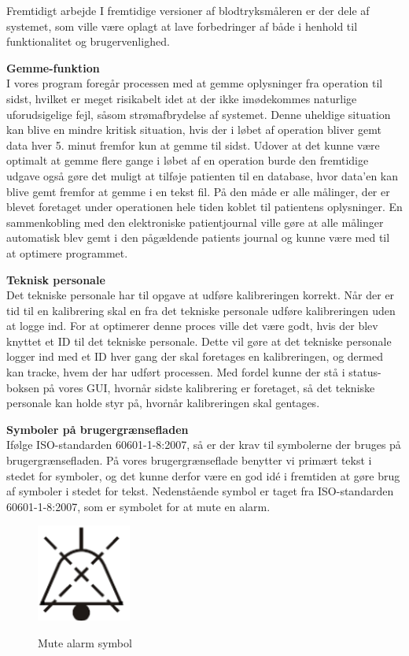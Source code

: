 Fremtidigt arbejde
I fremtidige versioner af blodtryksmåleren er der dele af systemet, som ville være oplagt at lave forbedringer af både i henhold til funktionalitet og brugervenlighed. 

\textbf{Gemme-funktion}
\\I vores program foregår processen med at gemme oplysninger fra operation til sidst, hvilket er meget risikabelt idet at der ikke imødekommes naturlige uforudsigelige fejl, såsom strømafbrydelse af systemet. Denne uheldige situation kan blive en mindre kritisk situation, hvis der i løbet af operation bliver gemt data hver 5. minut fremfor kun at gemme til sidst.
Udover at det kunne være optimalt at gemme flere gange i løbet af en operation burde den fremtidige udgave også gøre det muligt at tilføje patienten til en database, hvor data’en kan blive gemt fremfor at gemme i en tekst fil. På den måde er alle målinger, der er blevet foretaget under operationen hele tiden koblet til patientens oplysninger. En sammenkobling med den elektroniske patientjournal ville gøre at alle målinger automatisk blev gemt i den pågældende patients journal og kunne være med til at optimere programmet.

\textbf{Teknisk personale}
\\Det tekniske personale har til opgave at udføre kalibreringen korrekt. Når der er tid til en kalibrering skal en fra det tekniske personale udføre kalibreringen uden at logge ind. For at optimerer denne proces ville det være godt, hvis der blev knyttet et ID til det tekniske personale. Dette vil gøre at det tekniske personale logger ind med et ID hver gang der skal foretages en kalibreringen, og dermed kan tracke, hvem der har udført processen. Med fordel kunne der stå i status-boksen på vores GUI, hvornår sidste kalibrering er foretaget, så det tekniske personale kan holde styr på, hvornår kalibreringen skal gentages.

\textbf{Symboler på brugergrænsefladen}
\\Ifølge ISO-standarden 60601-1-8:2007, så er der krav til symbolerne der bruges på brugergrænsefladen. På vores brugergrænseflade benytter vi primært tekst i stedet for symboler, og det kunne derfor være en god idé i fremtiden at gøre brug af symboler i stedet for tekst. Nedenstående symbol er taget fra ISO-standarden 60601-1-8:2007, som er symbolet for at mute en alarm.

\begin{figure}[h!]
	\centering
	\includegraphics[width=0.15\linewidth]{fremtidigt_arbejde/fremtidigt_arbejde/mute_alarm_billede}
	\label{fig:Mute_alarm_billede}
	\caption{Mute alarm symbol}
\end{figure}


